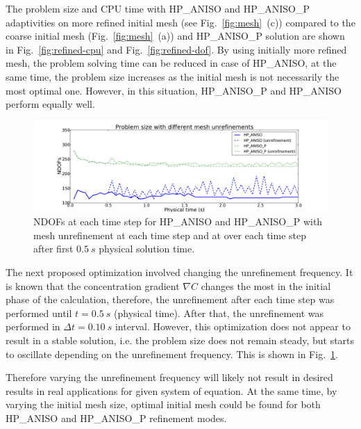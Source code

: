 The problem size and CPU time with HP\_ANISO
and HP\_ANISO\_P adaptivities on more refined initial mesh (see Fig.~\ref{fig:mesh}~(c))
compared to the coarse initial mesh (Fig.~\ref{fig:mesh}~(a)) and 
HP\_ANISO\_P solution are shown in Fig.~\ref{fig:refined-cpu} and Fig.~\ref{fig:refined-dof}.
By using initially more refined mesh, the problem solving time
can be reduced in case of HP\_ANISO, at the same time, the problem size increases
as the initial mesh is not necessarily the most optimal one.
However, in this situation, HP\_ANISO\_P and HP\_ANISO perform equally well.

\begin{figure}[!ht]
  \begin{centering}
  \includegraphics[width=\columnwidth]{unreffreq_dof}
  \caption{\label{fig:unreffreq-dof} NDOFs at each time step for
  HP\_ANISO and HP\_ANISO\_P with mesh unrefinement at each time step and at over each
  	time step after first $0.5\ s$ physical solution time.}
  \end{centering}
\end{figure}
The next proposed optimization involved changing the unrefinement frequency.
It is known that the concentration gradient $\nabla C$ changes the most in the initial phase
of the calculation, therefore, the unrefinement after each time step was performed
until $t=0.5\ s$ (physical time). After that, the
unrefinement was performed in $\Delta t = 0.10\ s$ interval.
However, this optimization does not appear to result in a stable solution, 
i.e. the problem size 
does not remain steady, but starts to oscillate depending on the unrefinement
frequency. This is shown in Fig.~\ref{fig:unreffreq-dof}. 

Therefore varying the unrefinement frequency will
likely not result in desired results in real applications for given system of equation.
At the same time, by varying the initial mesh size, optimal initial mesh could be found
for both HP\_ANISO and HP\_ANISO\_P refinement modes.
	 
